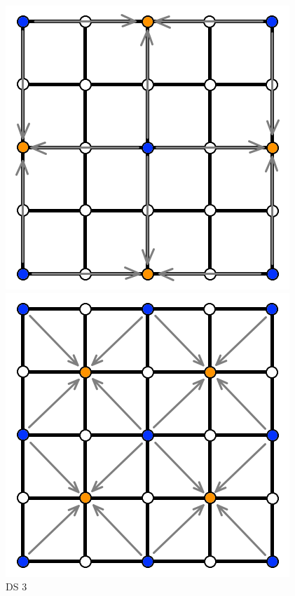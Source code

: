\documentclass[11pt,a4paper,twoside,openright]{report}
\begin{document}
\begin{figure}[!htb]
  \includegraphics[width=\linewidth]{ds3.png}
  \caption{DS 3}\label{fig:ds3}
\endminipage\hfill
{}
  \includegraphics[width=\linewidth]{ds4.png}

\end{figure}
\end{document}
